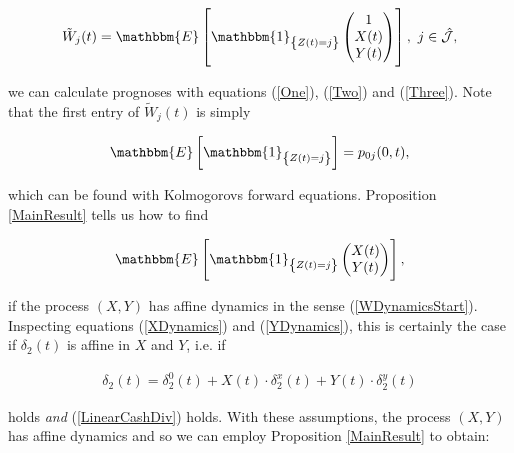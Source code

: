 \documentclass{article}
\newcommand{\1}[1]{\mathbbm{1}_{\left\lbrace #1 \right\rbrace}}
\newcommand{\expec}[1][def]{\mathbbm{E} \left[ #1 \right]}
\theoremstyle{break}
\theoremstyle{remark}
\numberwithin{equation}{section}
\begin{document}
\begin{align*}
	\tilde{W}_j(t) = \expec[\1{Z(t)=j}\begin{pmatrix}1  \\ X(t) \\ Y(t)\end{pmatrix}], \, \, j \in \hat{\mathcal{J}},
\end{align*}
	
we can calculate prognoses with equations (\ref{One}), (\ref{Two}) and (\ref{Three}). Note that the first entry of $\tilde{W}_j(t)$ is simply

\begin{align*}
	\expec[\1{Z(t)=j}] = p_{0j}(0,t),
\end{align*}

which can be found with Kolmogorovs forward equations. Proposition \ref{MainResult} tells us how to find

\begin{align*}
\expec[\1{Z(t)=j}\begin{pmatrix}X(t) \\ Y(t)\end{pmatrix}],
\end{align*}

if the process $(X,Y)$ has affine dynamics in the sense (\ref{WDynamicsStart}). Inspecting equations (\ref{XDynamics}) and (\ref{YDynamics}), this is certainly the case if $\delta_2(t)$ is affine in $X$ and $Y$, i.e. if

\begin{align} \label{LinearBenDiv}
	\delta_2(t) = \delta_2^0(t) + X(t) \cdot \delta_2^x(t) + Y(t) \cdot \delta_2^y(t)
\end{align}

holds \textit{and} (\ref{LinearCashDiv}) holds. With these assumptions, the process $(X,Y)$ has affine dynamics and so we can employ Proposition \ref{MainResult} to obtain:
\end{document}
